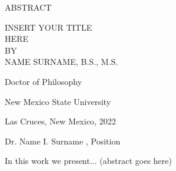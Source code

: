 \begin{center}
ABSTRACT
\end{center}
\vspace{0.3in}
\begin{center}
INSERT YOUR TITLE\\ HERE
\\
BY
\\
NAME SURNAME, B.S., M.S.
\end{center}
\vspace{0.3in}
\begin{center}
Doctor of Philosophy

New Mexico State University

Las Cruces, New Mexico, 2022

Dr. Name I. Surname , Position
\end{center}
\vspace{0.3in}
\hspace{\parindent}
In this work we present... (abstract goes here)
